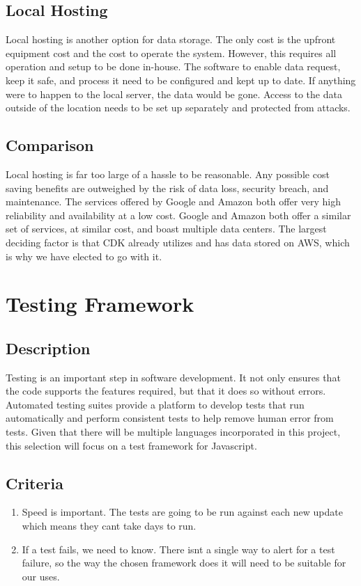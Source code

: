 \documentclass[letterpaper,10pt,onecolumn]{IEEEtran}
\begin{document}
  \subsection {Local Hosting}
    Local hosting is another option for data storage. The only cost is the upfront equipment cost and the cost to operate the system. However, this requires all operation and setup to be done in-house. The software to enable data request, keep it safe, and process it need to be configured and kept up to date. If anything were to happen to the local server, the data would be gone. Access to the data outside of the location needs to be set up separately and protected from attacks.

  \subsection {Comparison}
    Local hosting is far too large of a hassle to be reasonable. Any possible cost saving benefits are outweighed by the risk of data loss, security breach, and maintenance. The services offered by Google and Amazon both offer very high reliability and availability at a low cost. Google and Amazon both offer a similar set of services, at similar cost, and boast multiple data centers. The largest deciding factor is that CDK already utilizes and has data stored on AWS, which is why we have elected to go with it.

\section{Testing Framework}
  \subsection {Description}
    Testing is an important step in software development. It not only ensures that the code supports the features required, but that it does so without errors. Automated testing suites provide a platform to develop tests that run automatically and perform consistent tests to help remove human error from tests. Given that there will be multiple languages incorporated in this project, this selection will focus on a test framework for Javascript.
  \subsection {Criteria}
    \begin{enumerate}
      \item Speed is important. The tests are going to be run against each new update which means they can\textsc{}t take days to run.
      \item If a test fails, we need to know. There isn\textsc{}t a single way to alert for a test failure, so the way the chosen framework does it will need to be suitable for our uses.
    \end{enumerate}
\end{document}

